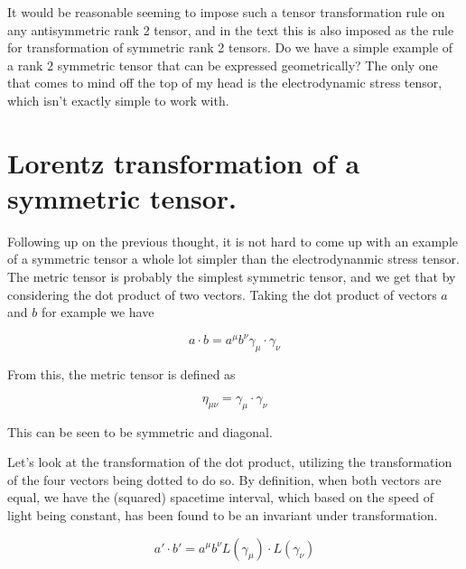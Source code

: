 It would be reasonable seeming to impose such a tensor transformation rule on any antisymmetric rank 2 tensor, and in the text this is also imposed as the rule for transformation of symmetric rank 2 tensors.  Do we have a simple example of a rank 2 symmetric tensor that can be expressed geometrically?  The only one that comes to mind off the top of my head is the electrodynamic stress tensor, which isn't exactly simple to work with.

\section{Lorentz transformation of a symmetric tensor.}

Following up on the previous thought, it is not hard to come up with an example of a symmetric tensor a whole lot simpler than the electrodynanmic stress tensor.  The metric tensor is probably the simplest symmetric tensor, and we get that by considering the dot product of two vectors.  Taking the dot product of vectors $a$ and $b$ for example we have

\begin{equation}\label{eqn:antisymmetricTensorTx:300}
a \cdot b 
= a^\mu b^\nu \gamma_\mu \cdot \gamma_\nu
\end{equation}

From this, the metric tensor is defined as

\begin{equation}\label{eqn:antisymmetricTensorTx:310}
\eta_{\mu\nu} = \gamma_\mu \cdot \gamma_\nu
\end{equation}

This can be seen to be symmetric and diagonal.

Let's look at the transformation of the dot product, utilizing the transformation of the four vectors being dotted to do so.  By definition, when both vectors are equal, we have the (squared) spacetime interval, which based on the speed of light being constant, has been found to be an invariant under transformation.

\begin{equation}\label{eqn:antisymmetricTensorTx:320}
a' \cdot b'
= 
a^\mu b^\nu L(\gamma_\mu) \cdot L(\gamma_\nu)
\end{equation}

\EndArticle

